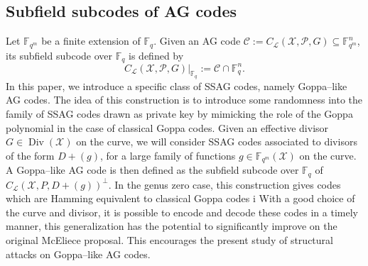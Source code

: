 \documentclass[a4paper]{amsart}
\theoremstyle{definition}
\theoremstyle{remark}
\newcommand{\calP}{\mathcal{P}}
\newcommand{\calL}{\mathcal{L}}
\newcommand{\calC}{\mathcal{C}}
\newcommand{\calX}{\mathcal{X}}
\newcommand{\fqm}{\mathbb{F}_{q^m}}
\newcommand{\fq}{\mathbb{F}_{q}}
\newcommand{\Div}{\operatorname{Div}}
\begin{document}
\subsection*{Subfield subcodes of AG codes}
Let $\fqm$ be a finite extension of $\fq$. Given an AG code $\calC :=C_{\calL}(\calX,\calP,G) \subseteq \fqm^n$, its subfield subcode over $\fq$ is defined by 
$$C_{\calL}(\calX,\calP,G)|_{\fq} := \calC \cap \fq^n.$$  
In this paper, we introduce a specific class of SSAG codes, namely Goppa--like AG codes. The idea of this construction is to introduce  some randomness into the family of SSAG codes drawn as private key by mimicking the role of the Goppa polynomial in the case of classical Goppa codes. Given an effective divisor $G\in \Div(\calX)$ on the curve, we will consider SSAG codes associated to divisors of the form $D+(g)$, for a large family of functions $g \in \fqm(\calX)$ on the curve. A Goppa--like AG code is then defined as the subfield subcode over $\fq$ of $C_{\calL}(\calX,P,D+(g))^{\perp}$. In the genus zero case, this construction gives codes which are Hamming equivalent to classical Goppa codes i With a good choice of the curve and divisor, it is possible to encode and decode these codes in a timely manner, this generalization has the potential to significantly improve on the original McEliece proposal. This encourages the present study of structural attacks on Goppa--like AG codes. 
\end{document}
